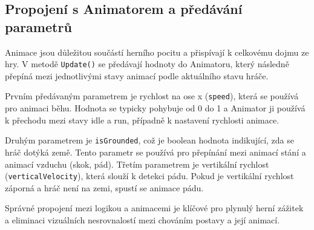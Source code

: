 \subsection{Propojení s Animatorem a předávání parametrů}

Animace jsou důležitou součástí herního pocitu a přispívají k celkovému dojmu ze hry. V metodě \texttt{Update()} se předávají hodnoty do Animatoru, který následně přepíná mezi jednotlivými stavy animací podle aktuálního stavu hráče.

Prvním předávaným parametrem je rychlost na ose x (\texttt{speed}), která se používá pro animaci běhu. Hodnota se typicky pohybuje od 0 do 1 a Animator ji používá k přechodu mezi stavy idle a run, případně k nastavení rychlosti animace.

Druhým parametrem je \texttt{isGrounded}, což je boolean hodnota indikující, zda se hráč dotýká země. Tento parametr se používá pro přepínání mezi animací stání a animací vzduchu (skok, pád). Třetím parametrem je vertikální rychlost (\texttt{verticalVelocity}), která slouží k detekci pádu. Pokud je vertikální rychlost záporná a hráč není na zemi, spustí se animace pádu.

Správné propojení mezi logikou a animacemi je klíčové pro plynulý herní zážitek a eliminaci vizuálních nesrovnalostí mezi chováním postavy a její animací.